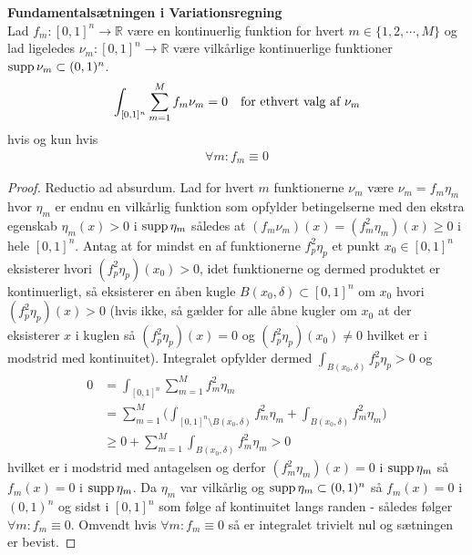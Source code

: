 \begin{thm} {\bf Fundamentalsætningen i Variationsregning}\\
Lad $f_m : [0,1]^n \to \mathbb{R}$ være en kontinuerlig funktion for hvert $m \in \{1, 2, \cdots, M \}$ og lad ligeledes $\nu_m : [0,1]^n \to \mathbb{R}$ være vilkårlige kontinuerlige funktioner $\textnormal{supp}\, \nu_m \subset (0,1)^n$.
\begin{align*}
\int_{[0,1]^n} \sum_{m=1}^M f_m \nu_m = 0 \quad \textnormal{for ethvert valg af $\nu_m$}
\end{align*}
hvis og kun hvis 
\begin{align*}
\forall m : f_m \equiv 0
\end{align*}
\end{thm}


\begin{proof} Reductio ad absurdum. Lad for hvert $m$ funktionerne $\nu_m $ være $\nu_m = f_m \eta_m$ hvor $\eta_m$ er endnu en vilkårlig funktion som opfylder betingelserne med den ekstra egenskab $\eta_m(x) >0$ i $\textnormal{supp}\, \eta_m$ således at $(f_m \nu_m)(x) = (f^2_m \eta_m)(x) \geq 0$ i hele $[0,1]^n$. Antag at for mindst en af funktionerne $f^2_p \eta_p$ et punkt $x_0 \in [0,1]^n$  eksisterer hvori $(f^2_p \eta_p)(x_0)>0$, idet funktionerne og dermed produktet er kontinuerligt, så eksisterer en åben kugle $B(x_0,\delta) \subset [0,1]^n$ om $x_0$ hvori $(f^2_p \eta_p)(x)>0$ (hvis ikke, så gælder for alle åbne kugler om $x_0$ at der eksisterer $x$ i kuglen så $(f^2_p \eta_p)(x)=0$ og $(f^2_p \eta_p)(x_0) \neq 0$ hvilket er i modstrid med kontinuitet). Integralet opfylder dermed $\int_{ B(x_0,\delta)} f^2_p \eta_p > 0$ og
\begin{align*}
0&=\int_{[0,1]^n} \sum_{m=1}^M f^2_m \eta_m  \\
&=\sum_{m=1}^M \Big(\int_{[0,1]^n\setminus B(x_0,\delta)}f^2_m \eta_m + \int_{ B(x_0,\delta)} f^2_m \eta_m \Big) \\
&\geq 0+\sum_{m=1}^M\int_{ B(x_0,\delta)} f^2_m \eta_m > 0
\end{align*}
hvilket er i modstrid med antagelsen og derfor $(f^2_m \eta_m)(x)= 0$ i $\textnormal{supp}\, \eta_m$ så $f_m(x) = 0$ i $\textnormal{supp}\, \eta_m$. Da $\eta_m$ var vilkårlig og $\textnormal{supp}\, \eta_m \subset (0,1)^n$ så $f_m(x) = 0$ i $(0,1)^n$ og sidst i $[0,1]^n$ som følge af kontinuitet langs randen - således følger $\forall m : f_m \equiv 0$. Omvendt hvis $\forall m : f_m \equiv 0$ så er integralet trivielt nul og sætningen er bevist.
\end{proof}



